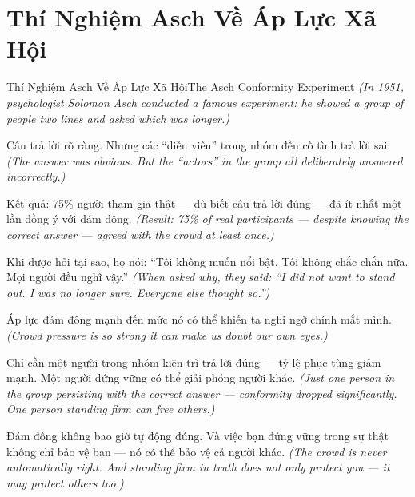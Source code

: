 \section{Thí Nghiệm Asch Về Áp Lực Xã Hội}
\begin{truyen}{Thí Nghiệm Asch Về Áp Lực Xã Hội}{The Asch Conformity Experiment}
\textit{(In 1951, psychologist Solomon Asch conducted a famous experiment: he showed a group of people two lines and asked which was longer.)}

Câu trả lời rõ ràng. Nhưng các ``diễn viên'' trong nhóm đều cố tình trả lời sai.
\textit{(The answer was obvious. But the ``actors'' in the group all deliberately answered incorrectly.)}

Kết quả: 75\% người tham gia thật — dù biết câu trả lời đúng — đã ít nhất một lần đồng ý với đám đông.
\textit{(Result: 75\% of real participants — despite knowing the correct answer — agreed with the crowd at least once.)}

Khi được hỏi tại sao, họ nói: ``Tôi không muốn nổi bật. Tôi không chắc chắn nữa. Mọi người đều nghĩ vậy.''
\textit{(When asked why, they said: ``I did not want to stand out. I was no longer sure. Everyone else thought so.'')}

Áp lực đám đông mạnh đến mức nó có thể khiến ta nghi ngờ chính mắt mình.
\textit{(Crowd pressure is so strong it can make us doubt our own eyes.)}

Chỉ cần một người trong nhóm kiên trì trả lời đúng — tỷ lệ phục tùng giảm mạnh. Một người đứng vững có thể giải phóng người khác.
\textit{(Just one person in the group persisting with the correct answer — conformity dropped significantly. One person standing firm can free others.)}

\end{truyen}

\begin{baihoc}
Đám đông không bao giờ tự động đúng. Và việc bạn đứng vững trong sự thật không chỉ bảo vệ bạn — nó có thể bảo vệ cả người khác.
\textit{(The crowd is never automatically right. And standing firm in truth does not only protect you — it may protect others too.)}
\end{baihoc}
\ngancach

